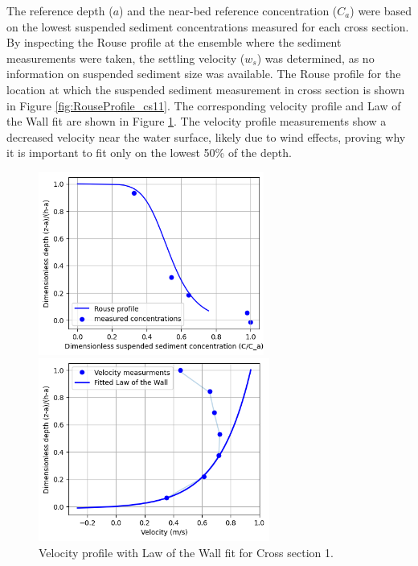 The reference depth ($a$) and the near-bed reference concentration ($C_a$) were based on the lowest suspended sediment concentrations measured for each cross section. By inspecting the Rouse profile at the ensemble where the sediment measurements were taken, the settling velocity ($w_s$) was determined, as no information on suspended sediment size was available. The Rouse profile for the location at which the suspended sediment measurement in cross section is shown in Figure \ref{fig:RouseProfile_cs11}. The corresponding velocity profile and Law of the Wall fit are shown in Figure \ref{fig:VelProfile_cs11}. The velocity profile measurements show a decreased velocity near the water surface, likely due to wind effects, proving why it is important to fit only on the lowest 50\% of the depth.

\begin{figure}[H]
    \centering
    \begin{minipage}[t]{0.48\linewidth}
        \centering
        \includegraphics[height=6cm]{figures/ch6/RouseProfile_cs11.png}
        \caption{Rouse profile for Cross section 1.}
        \label{fig:RouseProfile_cs11}
    \end{minipage}
    \hfill
    \begin{minipage}[t]{0.48\linewidth}
        \centering
        \includegraphics[height=6cm]{figures/ch6/cs1_vel_big.png}
        \caption{Velocity profile with Law of the Wall fit for Cross section 1.}
        \label{fig:VelProfile_cs11}
    \end{minipage}
\end{figure}

